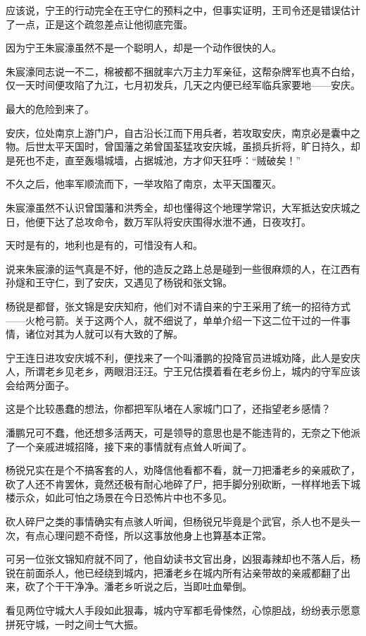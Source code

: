 \begin{multicols}{\theparacolNo}
应该说，宁王的行动完全在王守仁的预料之中，但事实证明，王司令还是错误估计了一点，正是这个疏忽差点让他彻底完蛋。

因为宁王朱宸濠虽然不是一个聪明人，却是一个动作很快的人。

朱宸濠同志说一不二，棉被都不捆就率六万主力军亲征，这帮杂牌军也真不白给，仅一天时间便攻陷了九江，七月初发兵，几天之内便已经军临兵家要地——安庆。

最大的危险到来了。

安庆，位处南京上游门户，自古沿长江而下用兵者，若攻取安庆，南京必是囊中之物。后世太平天国时，曾国藩之弟曾国荃猛攻安庆城，虽损兵折将，旷日持久，却是死也不走，直至轰塌城墙，占据城池，方才仰天狂呼：“贼破矣！”

不久之后，他率军顺流而下，一举攻陷了南京，太平天国覆灭。

朱宸濠虽然不认识曾国藩和洪秀全，却也懂得这个地理学常识，大军抵达安庆城之日，他便下达了总攻命令，数万军队将安庆围得水泄不通，日夜攻打。

天时是有的，地利也是有的，可惜没有人和。

说来朱宸濠的运气真是不好，他的造反之路上总是碰到一些很麻烦的人，在江西有孙燧和王守仁，到了安庆，又遇见了杨锐和张文锦。

杨锐是都督，张文锦是安庆知府，他们对不请自来的宁王采用了统一的招待方式——火枪弓箭。关于这两个人，就不细说了，单单介绍一下这二位干过的一件事情，诸位对其为人就可以有大致的了解。

宁王连日进攻安庆城不利，便找来了一个叫潘鹏的投降官员进城劝降，此人是安庆人，所谓老乡见老乡，两眼泪汪汪。宁王兄估摸着看在老乡份上，城内的守军应该会给两分面子。

这是个比较愚蠢的想法，你都把军队堵在人家城门口了，还指望老乡感情？

潘鹏兄可不蠢，他还想多活两天，可是领导的意思也是不能违背的，无奈之下他派了一个亲戚进城招降，接下来的事情就有点耸人听闻了。

杨锐兄实在是个不搞客套的人，劝降信他看都不看，就一刀把潘老乡的亲戚砍了，砍了人还不肯罢休，竟然还极有耐心地碎了尸，把手脚分别砍断，一样样地丢下城楼示众，如此可怕之场景在今日恐怖片中也不多见。

砍人碎尸之类的事情确实有点骇人听闻，但杨锐兄毕竟是个武官，杀人也不是头一次，有点心理问题不奇怪，所以这事放他身上也算基本正常。

可另一位张文锦知府就不同了，他自幼读书文官出身，凶狠毒辣却也不落人后，杨锐在前面杀人，他已经绕到城内，把潘老乡在城内所有沾亲带故的亲戚都翻了出来，砍了个干干净净。潘老乡听说之后，当即吐血晕倒。

看见两位守城大人手段如此狠毒，城内守军都毛骨悚然，心惊胆战，纷纷表示愿意拼死守城，一时之间士气大振。


\end{multicols}
